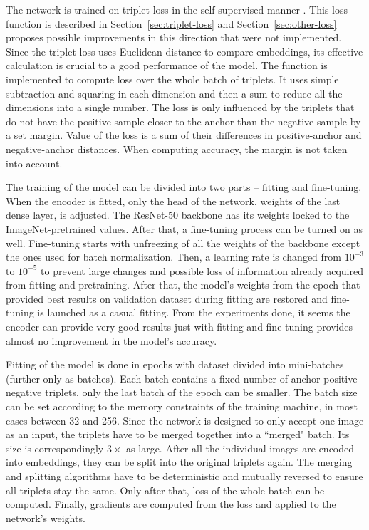 The network is trained on triplet loss in the self-supervised manner \cite{facenet-triplet-loss}. This loss function is described in Section~\ref{sec:triplet-loss} and Section~\ref{sec:other-loss} proposes possible improvements in this direction that were not implemented. Since the triplet loss uses Euclidean distance to compare embeddings, its effective calculation is crucial to a good performance of the model. The function is implemented to compute loss over the whole batch of triplets. It uses simple subtraction and squaring in each dimension and then a sum to reduce all the dimensions into a single number. The loss is only influenced by the triplets that do not have the positive sample closer to the anchor than the negative sample by a set margin. Value of the loss is a sum of their differences in positive-anchor and negative-anchor distances. When computing accuracy, the margin is not taken into account.

The training of the model can be divided into two parts -- fitting and fine-tuning. When the encoder is fitted, only the head of the network, weights of the last dense layer, is adjusted. The ResNet-50 backbone has its weights locked to the ImageNet-pretrained values. After that, a fine-tuning process can be turned on as well. Fine-tuning starts with unfreezing of all the weights of the backbone except the ones used for batch normalization. Then, a learning rate is changed from $10^{-3}$ to $10^{-5}$ to prevent large changes and possible loss of information already acquired from fitting and pretraining. After that, the model's weights from the epoch that provided best results on validation dataset during fitting are restored and fine-tuning is launched as a casual fitting. From the experiments done, it seems the encoder can provide very good results just with fitting and fine-tuning provides almost no improvement in the model's accuracy.

Fitting of the model is done in epochs with dataset divided into mini-batches (further only as batches). Each batch contains a fixed number of anchor-positive-negative triplets, only the last batch of the epoch can be smaller. The batch size can be set according to the memory constraints of the training machine, in most cases between 32 and 256. Since the network is designed to only accept one image as an input, the triplets have to be merged together into a ``merged" batch. Its size is correspondingly $3 \times$ as large. After all the individual images are encoded into embeddings, they can be split into the original triplets again. The merging and splitting algorithms have to be deterministic and mutually reversed to ensure all triplets stay the same. Only after that, loss of the whole batch can be computed. Finally, gradients are computed from the loss and applied to the network's weights.

